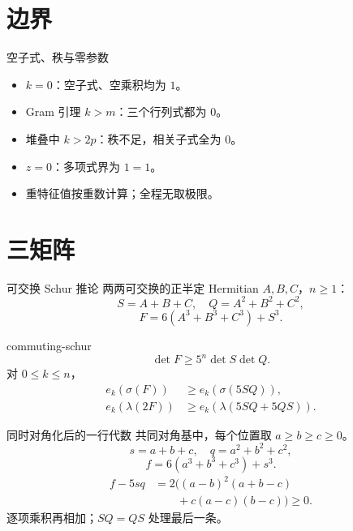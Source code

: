 \documentclass{beamer}
\begin{document}
\section{边界}
\begin{frame}{空子式、秩与零参数}
\begin{itemize}
\item $k=0$：空子式、空乘积均为 $1$。
\item Gram 引理 $k>m$：三个行列式都为 $0$。
\item 堆叠中 $k>2p$：秩不足，相关子式全为 $0$。
\item $z=0$：多项式界为 $1=1$。
\item 重特征值按重数计算；全程无取极限。
\end{itemize}
\end{frame}
\section{三矩阵}
\begin{frame}{可交换 Schur 推论}
两两可交换的正半定 Hermitian $A,B,C$，$n\geq1$：
\[
S=A+B+C,\quad Q=A^2+B^2+C^2,
\]
\[
F=6(A^3+B^3+C^3)+S^3.
\]
\begin{bookresult}{commuting-schur}
\[
\det F\geq5^n\det S\det Q.
\]
对 $0\leq k\leq n$，
\begin{align*}
e_k(\sigma(F))&\geq e_k(\sigma(5SQ)),\\
e_k(\lambda(2F))&\geq e_k(\lambda(5SQ+5QS)).
\end{align*}
\end{bookresult}
\end{frame}
\begin{frame}{同时对角化后的一行代数}
共同对角基中，每个位置取 $a\geq b\geq c\geq0$。
\[
s=a+b+c,\quad q=a^2+b^2+c^2,
\]
\[
f=6(a^3+b^3+c^3)+s^3.
\]
\begin{align*}
f-5sq&=2\bigl((a-b)^2(a+b-c)\\
&\hspace{2em}+c(a-c)(b-c)\bigr)\geq0.
\end{align*}
逐项乘积再相加；$SQ=QS$ 处理最后一条。

\end{frame}
\FormalVerification
\end{document}
